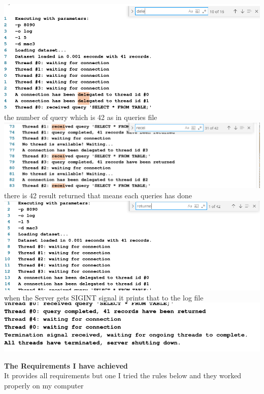 \documentclass{report}
\begin{document}
\includegraphics[width=\textwidth,height=\textheight,keepaspectratio]{images/delegated.png}\\ the number of query  which is 42 as in queries file\\
\includegraphics[width=\textwidth,height=\textheight,keepaspectratio]{images/received.png}\\ there is 42 result returned that means each queries has done\\
\includegraphics[width=\textwidth,height=\textheight,keepaspectratio]{images/returned.png}\\ when the Server gets SIGINT signal it prints that to the log file\\
\includegraphics[width=\textwidth,height=\textheight,keepaspectratio]{images/shutdown.png}

{\huge \textbf{The Requirements I have achieved} \\}
{\large It provides all requirements but one }
 {\large I tried the rules below and they worked properly on my computer}
 
\end{document}
